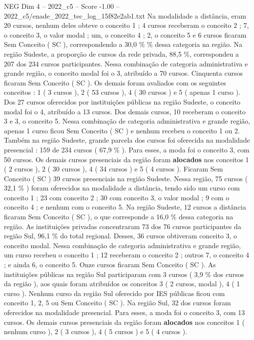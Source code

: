 \begin{textsample}{NEG Dim 4 – 2022\_c5 – Score -1.00 – 2022\_c5/enade\_2022\_tec\_log\_15f82e2ab1.txt}
Na modalidade a distância, eram 20 cursos, nenhum deles obteve o conceito 1 ; 4 cursos receberam o conceito 2 ; 7, o conceito 3, o valor modal ; um, o conceito 4 ; 2, o conceito 5 e 6 cursos ficaram Sem Conceito ( SC ), correspondendo a 30,0 \% \% dessa categoria na região.
Na região Sudeste, a proporção de cursos da rede privada, 88,5 \%, correspondeu a 207 dos 234 cursos participantes.
Nessa combinação de categoria administrativa e grande região, o conceito modal foi o 3, atribuído a 70 cursos.
Cinquenta cursos ficaram Sem Conceito ( SC ).
Os demais foram avaliados com os seguintes conceitos : 1 ( 3 cursos ), 2 ( 53 cursos ), 4 ( 30 cursos ) e 5 ( apenas 1 curso ).
Dos 27 cursos oferecidos por instituições públicas na região Sudeste, o conceito modal foi o 4, atribuído a 13 cursos.
Dos demais cursos, 10 receberam o conceito 3 e 3, o conceito 5.
Nessa combinação de categoria administrativa e grande região, apenas 1 curso ficou Sem Conceito ( SC ) e nenhum recebeu o conceito 1 ou 2.
Também na região Sudeste, grande parcela dos cursos foi oferecida na modalidade presencial : 159 de 234 cursos ( 67,9 \% ).
Para esses, a moda foi o conceito 3, com 50 cursos.
Os demais cursos presenciais da região foram \textbf{alocados} nos conceitos 1 ( 2 cursos ), 2 ( 30 cursos ), 4 ( 34 cursos ) e 5 ( 4 cursos ).
Ficaram Sem Conceito ( SC ) 39 cursos presenciais na região Sudeste.
Nessa região, 75 cursos ( 32,1 \% ) foram oferecidos na modalidade a distância, tendo sido um curso com conceito 1 ; 23 com conceito 2 ; 30 com conceito 3, o valor modal ; 9 com o conceito 4 ; e nenhum com o conceito 5.
Na região Sudeste, 12 cursos a distância ficaram Sem Conceito ( SC ), o que corresponde a 16,0 \% dessa categoria na região.
As instituições privadas concentraram 73 dos 76 cursos participantes da região Sul, 96,1 \% do total regional.
Desses, 36 cursos obtiveram conceito 3, o conceito modal.
Nessa combinação de categoria administrativa e grande região, um curso recebeu o conceito 1 ; 12 receberam o conceito 2 ; outros 7, o conceito 4 ; e ainda 6, o conceito 5.
Onze cursos ficaram Sem Conceito ( SC ).
As instituições públicas na região Sul participaram com 3 cursos ( 3,9 \% dos cursos da região ), aos quais foram atribuídos os conceitos 3 ( 2 cursos, modal ), 4 ( 1 curso ).
Nenhum curso da região Sul oferecido por IES públicas ficou com conceito 1, 2, 5 ou Sem Conceito ( SC ).
Na região Sul, 32 dos cursos foram oferecidos na modalidade presencial.
Para esses, a moda foi o conceito 3, com 13 cursos.
Os demais cursos presenciais da região foram \textbf{alocados} nos conceitos 1 ( nenhum curso ), 2 ( 3 cursos ), 4 ( 5 cursos ) e 5 ( 4 cursos ).

\end{textsample}
